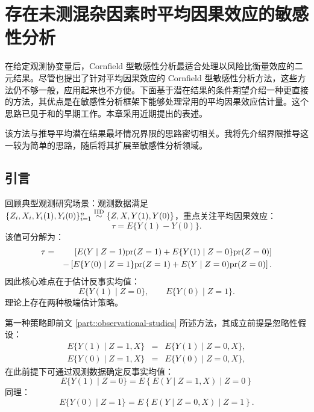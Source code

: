 
\chapter{存在未测混杂因素时平均因果效应的敏感性分析}
\label{chapter::sensitivity-ACE}


 
 
 
 
在给定观测协变量后，Cornfield 型敏感性分析最适合处理以风险比衡量效应的二元结果。尽管\citet{ding2016sensitivity}也提出了针对平均因果效应的 Cornfield 型敏感性分析方法，这些方法仍不够一般，应用起来也不方便。下面基于潜在结果的条件期望介绍一种更直接的方法，其优点是在敏感性分析框架下能够处理常用的平均因果效应估计量。这个思路已见于\citet{robins1999association}和\citet{scharfstein1999adjusting}的早期工作。本章采用\citet{luding2023flexible}近期提出的表述。  
 
 
 
 
 该方法与推导平均潜在结果最坏情况界限的思路密切相关。我将先介绍界限推导这一较为简单的思路，随后将其扩展至敏感性分析领域。



\section{引言}


回顾典型观测研究场景：观测数据满足 $\{  Z_i, X_i,  Y_i(1), Y_i(0) \}_{i=1}^n \stackrel{\textup{IID}}{\sim}  \{ Z, X, Y(1), Y(0) \}$，重点关注平均因果效应：
$$
\tau = E\{ Y(1) - Y(0) \}.
$$
该值可分解为：
\begin{eqnarray*}
\tau &=& \left[  E(Y\mid Z=1) \textup{pr}(Z=1) + E\{ Y(1)\mid Z=0 \} \textup{pr}(Z=0) \right]  \\
&&- \left[   E\{ Y(0)\mid Z=1\} \textup{pr}(Z=1) + E(Y\mid Z=0)  \textup{pr}(Z=0)  \right] . 
\end{eqnarray*}
因此核心难点在于估计反事实均值：
$$
E\{ Y(1)\mid Z=0 \}  ,\quad \quad E\{ Y(0)\mid Z=1\}.
$$
理论上存在两种极端估计策略。



第一种策略即前文 \ref{part::observational-studies} 所述方法，其成立前提是忽略性假设：
\begin{eqnarray*}
E\{ Y(1)\mid Z=1, X \} &=& E\{ Y(1)\mid Z=0, X \} ,\\ 
E\{ Y(0)\mid Z=1, X \} &=& E\{ Y(0)\mid Z=0, X \}, 
\end{eqnarray*}
在此前提下可通过观测数据确定反事实均值：
$$
E\{ Y(1)\mid Z=0 \}  
= E\left\{  E( Y\mid Z=1, X )  \mid Z=0\right\}
$$
同理：
$$
E\{ Y(0)\mid Z=1\} = E\left\{  E( Y\mid Z=0, X )  \mid Z=1\right\} . 
$$



